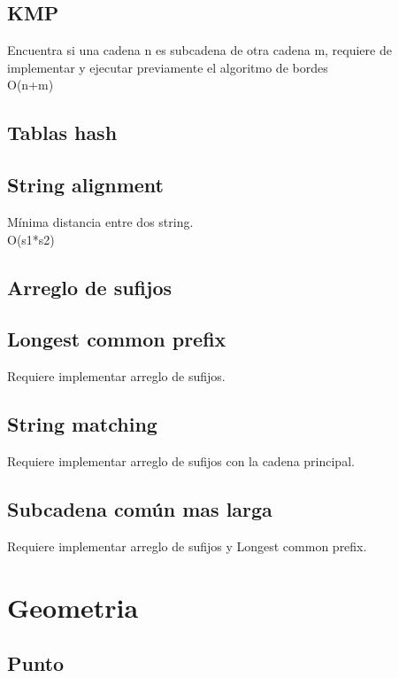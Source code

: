 \documentclass[10pt,landscape,twocolumn,letterpaper,twosided]{article}
\newcommand\cppfile[2][]{

}
\begin{document}
			\subsection{KMP}
			Encuentra si una cadena n es subcadena de otra cadena m, requiere de implementar
			y ejecutar previamente el algoritmo de bordes\\
			O(n+m)
			\cppfile[18-29]{cadenas/kmp.cpp}
			\subsection{Tablas hash}
			\cppfile[7-19]{cadenas/Hashing.cpp}
			\subsection{String alignment}
			Mínima distancia entre dos string.\\O(s1*s2)
			\cppfile[8-25]{cadenas/string_distance.cpp}
			\subsection{Arreglo de sufijos}
			\cppfile[7-48]{cadenas/Arreglo_de_sufijos.cpp}
			\subsection{Longest common prefix}
			Requiere implementar arreglo de sufijos.
			\cppfile[50-65]{cadenas/Arreglo_de_sufijos.cpp}
			\subsection{String matching}
			Requiere implementar arreglo de sufijos con la cadena principal.
			\cppfile[92-114]{cadenas/Arreglo_de_sufijos.cpp}
			\subsection{Subcadena común mas larga}
			Requiere implementar arreglo de sufijos y Longest common prefix.
			\cppfile[67-90]{cadenas/Arreglo_de_sufijos.cpp}
			
		\section{Geometria}
			\subsection{Punto}
			\cppfile[22-59]{geometria/punto.cpp}
\end{document}
